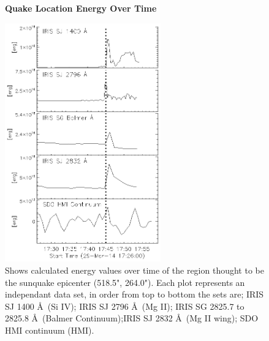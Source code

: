 \appendix
\appendixpage
\addappheadtotoc
%





\begin{figure}[H]
  \begin{center}
  \textbf{Quake Location Energy Over Time}\par\medskip
  \includegraphics[width=0.6\textwidth]{29-Mar-14-Quake-Energy-Ladder}
  \end{center}
  \caption{Shows calculated energy values over time of the region thought to be the sunquake epicenter (518.5", 264.0"). Each plot represents an independant data set, in order from top to bottom the sets are; IRIS SJ 1400 \AA\ (Si IV); IRIS SJ 2796 \AA\ (Mg II); IRIS SG  2825.7 to 2825.8 \AA\ (Balmer Continuum);IRIS SJ 2832 \AA\ (Mg II wing); SDO HMI continuum (HMI).}\label{eqk}
\end{figure}

